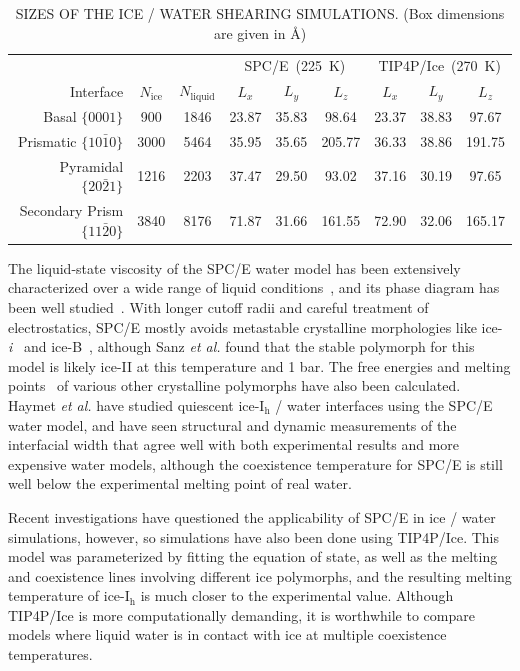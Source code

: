 \begin{table}[h]
\centering
\caption{SIZES OF THE ICE / WATER SHEARING SIMULATIONS. (Box
  dimensions are given in \AA)\label{tab:sizes}}
\begin{tabular}{r|cc|ccc|ccc}
\toprule
 & & & \multicolumn{3}{c|}{SPC/E~(225~K)} &  \multicolumn{3}{c}{TIP4P/Ice~(270~K)}\\
 Interface & $N_\mathrm{ice}$ &
 $N_\mathrm{liquid}$ & $L_x$ & $L_y$ & $L_z$ & $L_x$ & $L_y$ & $L_z$ \\
\midrule
Basal  $\{0001\}$                 & 900 & 1846  & 23.87 & 35.83 & 98.64  & 23.37 & 38.83 & 97.67  \\
Prismatic  $\{10\bar{1}0\}$       & 3000 & 5464 & 35.95 & 35.65 & 205.77 & 36.33 & 38.86 & 191.75 \\
Pyramidal  $\{20\bar{2}1\}$       & 1216 & 2203 & 37.47 & 29.50 & 93.02  & 37.16 & 30.19 & 97.65  \\
Secondary Prism  $\{11\bar{2}0\}$ & 3840 & 8176 & 71.87 & 31.66 & 161.55 & 72.90 & 32.06 & 165.17 \\
\bottomrule
\end{tabular}
\end{table}


The liquid-state viscosity of the SPC/E water model has been
extensively characterized over a wide range of liquid
conditions~\cite{Kuang2012}, and its phase diagram has been well
studied~\cite{Baez1995,Bryk2004,Sanz2004a,Fennell2005}. With longer
cutoff radii and careful treatment of electrostatics, SPC/E mostly
avoids metastable crystalline morphologies like
ice-\textit{i}~\cite{Fennell2005} and ice-B~\cite{Baez1995}, although
Sanz \textit{et al.}\cite{Sanz2004a} found that the stable polymorph
for this model is likely ice-II at this temperature and 1 bar. The
free energies and melting
points~\cite{Baez1995,Arbuckle2002,Gay2002,Bryk2002,Bryk2004,Sanz2004a,Fennell2005,Fernandez2006,Abascal2007,Vrbka2007}
of various other crystalline polymorphs have also been calculated.
Haymet \textit{et al.}\cite{Bryk2002} have studied quiescent
ice-I$_\mathrm{h}$ / water interfaces using the SPC/E water model, and
have seen structural and dynamic measurements of the interfacial width
that agree well with both experimental results and more expensive
water models, although the coexistence temperature for SPC/E is still
well below the experimental melting point of real water.  

Recent investigations have questioned the applicability of SPC/E in
ice / water simulations,\cite{Vega2005c,Vega2011a,Gladich2012,Gallo2016}
however, so simulations have also been done using
TIP4P/Ice.\cite{Abascal2005} This model was parameterized by fitting
the equation of state, as well as the melting and coexistence lines
involving different ice polymorphs, and the resulting melting
temperature of ice-I$_\mathrm{h}$ is much closer to the experimental
value.\cite{Abascal2005} Although TIP4P/Ice is more computationally
demanding, it is worthwhile to compare models where liquid water is in
contact with ice at multiple coexistence temperatures.

